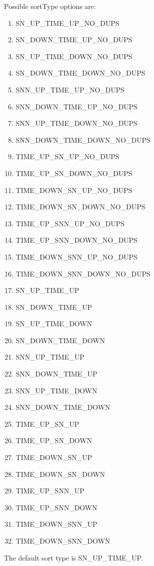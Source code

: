 \documentclass[letterpaper]{article}
\begin{document}
Possible sortType options are:
\begin{enumerate}
\item    SN\_UP\_TIME\_UP\_NO\_DUPS
\item    SN\_DOWN\_TIME\_UP\_NO\_DUPS
\item    SN\_UP\_TIME\_DOWN\_NO\_DUPS
\item    SN\_DOWN\_TIME\_DOWN\_NO\_DUPS
\item    SNN\_UP\_TIME\_UP\_NO\_DUPS
\item    SNN\_DOWN\_TIME\_UP\_NO\_DUPS
\item    SNN\_UP\_TIME\_DOWN\_NO\_DUPS
\item    SNN\_DOWN\_TIME\_DOWN\_NO\_DUPS
\item    TIME\_UP\_SN\_UP\_NO\_DUPS
\item    TIME\_UP\_SN\_DOWN\_NO\_DUPS
\item    TIME\_DOWN\_SN\_UP\_NO\_DUPS
\item    TIME\_DOWN\_SN\_DOWN\_NO\_DUPS
\item    TIME\_UP\_SNN\_UP\_NO\_DUPS
\item    TIME\_UP\_SNN\_DOWN\_NO\_DUPS
\item    TIME\_DOWN\_SNN\_UP\_NO\_DUPS
\item    TIME\_DOWN\_SNN\_DOWN\_NO\_DUPS
\item    SN\_UP\_TIME\_UP
\item    SN\_DOWN\_TIME\_UP
\item    SN\_UP\_TIME\_DOWN
\item    SN\_DOWN\_TIME\_DOWN
\item    SNN\_UP\_TIME\_UP
\item    SNN\_DOWN\_TIME\_UP
\item    SNN\_UP\_TIME\_DOWN
\item    SNN\_DOWN\_TIME\_DOWN
\item    TIME\_UP\_SN\_UP
\item    TIME\_UP\_SN\_DOWN
\item    TIME\_DOWN\_SN\_UP
\item    TIME\_DOWN\_SN\_DOWN
\item    TIME\_UP\_SNN\_UP
\item    TIME\_UP\_SNN\_DOWN
\item    TIME\_DOWN\_SNN\_UP
\item    TIME\_DOWN\_SNN\_DOWN
\end{enumerate}

The default sort type is SN\_UP\_TIME\_UP.
\end{document}
